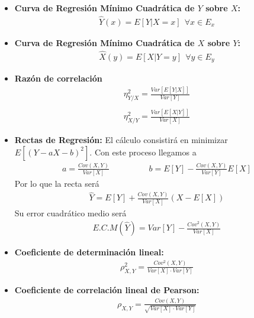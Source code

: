 \documentclass[12pt]{article}
\begin{document}
\begin{itemize}
        \item \textbf{Curva de Regresión Mínimo Cuadrática de $Y$ sobre $X$:}
        \begin{gather*}
            \hat{Y}(x)=E[Y|X=x]\ \ \forall x \in E_x
        \end{gather*}

        \item \textbf{Curva de Regresión Mínimo Cuadrática de $X$ sobre $Y$:}
        \begin{gather*}
            \hat{X}(y)=E[X|Y=y]\ \ \forall y \in E_y
        \end{gather*}

        \item \textbf{Razón de correlación}
        \begin{gather*}
            \eta^2_{Y/X} = \frac{Var[E[Y|X]]}{Var[Y]}\\\\
            \eta^2_{X/Y} = \frac{Var[E[X|Y]]}{Var[X]}
        \end{gather*}

        \item \textbf{Rectas de Regresión:}
        El cálculo consistirá en minimizar $E[(Y-aX-b)^2]$. Con este proceso llegamos a 
        \begin{gather*}
            a=\frac{Cov(X,Y)}{Var[X]}\hspace{2cm} b=E[Y]-\frac{Cov(X,Y)}{Var[Y]}E[X]
        \end{gather*}
        Por lo que la recta será
        \begin{gather*}
            \hat{Y}=E[Y]+\frac{Cov(X,Y)}{Var[X]}(X-E[X])
        \end{gather*}
        Su error cuadrático medio será
        \begin{gather*}
            E.C.M(\hat{Y}) = Var[Y] - \frac{Cov^2(X,Y)}{Var[X]}
        \end{gather*}

        \item \textbf{Coeficiente de determinación lineal:}
        \begin{gather*}
            \rho^2_{X,Y} = \frac{Cov^2(X,Y)}{Var[X]\cdot Var[Y]}
        \end{gather*}

        \item \textbf{Coeficiente de correlación lineal de Pearson:}
        \begin{gather*}
            \rho_{X,Y} = \frac{Cov(X,Y)}{\sqrt{Var[X]\cdot Var[Y]}}
        \end{gather*}
    \end{itemize}
\end{document}
